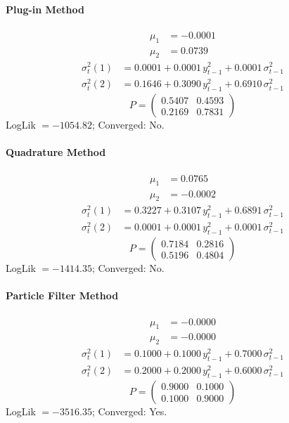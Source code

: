 \documentclass[11pt, a4paper]{article}
\begin{document}
\paragraph{Plug-in Method}
\begin{align}
\mu_{1} &= -0.0001 \\
\mu_{2} &= 0.0739
\end{align}
\begin{align}
\sigma^2_{t}(1) &= 0.0001 + 0.0001\, y_{t-1}^2 + 0.0001\, \sigma^2_{t-1} \\
\sigma^2_{t}(2) &= 0.1646 + 0.3090\, y_{t-1}^2 + 0.6910\, \sigma^2_{t-1}
\end{align}
\begin{equation}
P = \begin{pmatrix} 0.5407 & 0.4593 \\ 0.2169 & 0.7831 \end{pmatrix}
\end{equation}
LogLik $= -1054.82$; Converged: No.

\paragraph{Quadrature Method}
\begin{align}
\mu_{1} &= 0.0765 \\
\mu_{2} &= -0.0002
\end{align}
\begin{align}
\sigma^2_{t}(1) &= 0.3227 + 0.3107\, y_{t-1}^2 + 0.6891\, \sigma^2_{t-1} \\
\sigma^2_{t}(2) &= 0.0001 + 0.0001\, y_{t-1}^2 + 0.0001\, \sigma^2_{t-1}
\end{align}
\begin{equation}
P = \begin{pmatrix} 0.7184 & 0.2816 \\ 0.5196 & 0.4804 \end{pmatrix}
\end{equation}
LogLik $= -1414.35$; Converged: No.

\paragraph{Particle Filter Method}
\begin{align}
\mu_{1} &= -0.0000 \\
\mu_{2} &= -0.0000
\end{align}
\begin{align}
\sigma^2_{t}(1) &= 0.1000 + 0.1000\, y_{t-1}^2 + 0.7000\, \sigma^2_{t-1} \\
\sigma^2_{t}(2) &= 0.2000 + 0.2000\, y_{t-1}^2 + 0.6000\, \sigma^2_{t-1}
\end{align}
\begin{equation}
P = \begin{pmatrix} 0.9000 & 0.1000 \\ 0.1000 & 0.9000 \end{pmatrix}
\end{equation}
LogLik $= -3516.35$; Converged: Yes.
\end{document}
